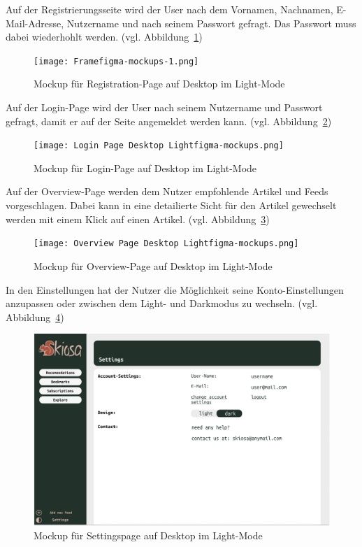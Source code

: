 Auf der Registrierungsseite wird der User nach dem 
Vornamen, Nachnamen, E-Mail-Adresse, Nutzername und nach seinem Passwort gefragt. Das Passwort muss dabei wiederhohlt werden. (vgl. Abbildung~\ref{fig:Registration Page Light})

\begin{figure}[H]
    \texttt{[image: Framefigma-mockups-1.png]}
    \caption{Mockup für Registration-Page auf Desktop im Light-Mode}
    \label{fig:Registration Page Light}
\end{figure}

Auf der Login-Page wird der User nach seinem Nutzername und Passwort gefragt, damit er auf der Seite angemeldet werden kann. (vgl. Abbildung~\ref{fig:Login Page Desktop Light})

\begin{figure}[H]
    \texttt{[image: Login Page Desktop Lightfigma-mockups.png]}
    \caption{Mockup für Login-Page auf Desktop im Light-Mode}
    \label{fig:Login Page Desktop Light}
\end{figure}

Auf der Overview-Page werden dem Nutzer empfohlende Artikel und Feeds vorgeschlagen. Dabei kann in eine detailierte Sicht für den Artikel gewechselt werden mit einem Klick auf einen Artikel. (vgl. Abbildung~\ref{fig:Overview Page Desktop Light})

\begin{figure}[H]
    \texttt{[image: Overview Page Desktop Lightfigma-mockups.png]}
    \caption{Mockup für Overview-Page auf Desktop im Light-Mode}
    \label{fig:Overview Page Desktop Light}
\end{figure}

In den Einstellungen hat der Nutzer die Möglichkeit seine Konto-Einstellungen anzupassen oder zwischen dem Light- und Darkmodus zu wechseln. (vgl. Abbildung~\ref{fig:Settings Interface Desktop Light})

\begin{figure}[H]
    \includegraphics[width=\linewidth]{images/Settings Interface Desktop Lightfigma-mockups.png}
    \caption{Mockup für Settingspage auf Desktop im Light-Mode}
    \label{fig:Settings Interface Desktop Light}
\end{figure}

